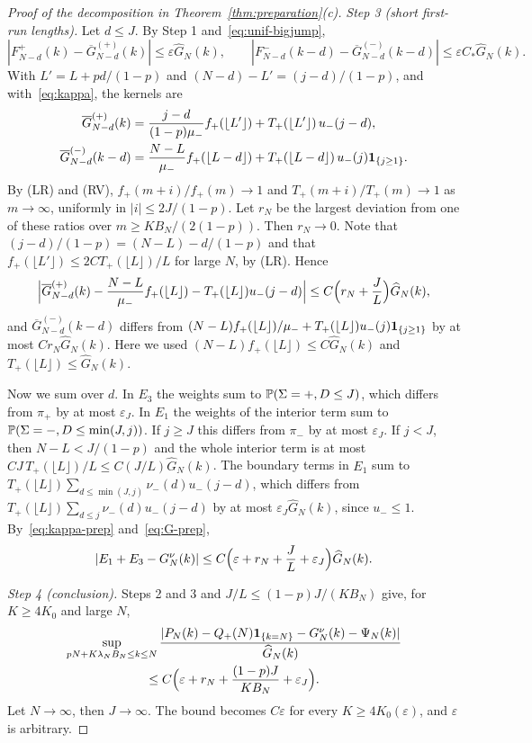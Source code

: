 \begin{proof}[Proof of the decomposition in Theorem~\ref{thm:preparation}(c)]
\emph{Step 3 (short first-run lengths).} Let $d\le J$. By Step 1
and~\eqref{eq:unif-bigjump},
\[
 |F^\plus_{N-d}(k)-\overline G^{(\plus)}_{N-d}(k)|\le\varepsilon\widehat G_N(k),\qquad
 |F^\minus_{N-d}(k-d)-\overline G^{(\minus)}_{N-d}(k-d)|\le\varepsilon C_*\widehat G_N(k).
\]
With $L'=L+pd/(1-p)$ and $(N-d)-L'=(j-d)/(1-p)$, and with~\eqref{eq:kappa}, the
kernels are
\begin{align*}
 \overline G^{({+})}_{N-d}(k)&=\frac{j-d}{(1-p)\mu_{-}}f_{+}(\lfloor L'\rfloor)+T_{+}(\lfloor L'\rfloor)\,u_{-}(j-d),\\
 \overline G^{({-})}_{N-d}(k-d)&=\frac{N-L}{\mu_{-}}f_{+}(\lfloor L-d\rfloor)+T_{+}(\lfloor L-d\rfloor)\,u_{-}(j)\mathbf{1}_{\{j\ge1\}} .
\end{align*}
By (LR) and (RV), $f_\plus(m+i)/f_\plus(m)\to1$ and $T_\plus(m+i)/T_\plus(m)\to1$ as
$m\to\infty$, uniformly in $|i|\le2J/(1-p)$. Let $r_N$ be the largest deviation
from one of these ratios over $m\ge KB_N/(2(1-p))$. Then $r_N\to0$. Note that
$(j-d)/(1-p)=(N-L)-d/(1-p)$ and that $f_\plus(\lfloor L'\rfloor)\le2CT_\plus(\lfloor L\rfloor)/L$
for large $N$, by (LR). Hence
\[
 \Bigl|\overline G^{({+})}_{N-d}(k)-\frac{N-L}{\mu_{-}}f_{+}(\lfloor L\rfloor)-T_{+}(\lfloor L\rfloor)u_{-}(j-d)\Bigr|
 \le C\Bigl(r_N+\frac JL\Bigr)\widehat G_N(k),
\]
and $\overline G^{(\minus)}_{N-d}(k-d)$ differs from
$(N-L)f_{+}(\lfloor L\rfloor)/\mu_{-}+T_{+}(\lfloor L\rfloor)u_{-}(j)\mathbf{1}_{\{j\ge1\}}$ by at
most $Cr_N\widehat G_N(k)$. Here we used $(N-L)f_\plus(\lfloor L\rfloor)\le C\widehat G_N(k)$
and $T_\plus(\lfloor L\rfloor)\le\widehat G_N(k)$.

Now we sum over $d$. In $E_3$ the weights sum to $\mathbb{P}(\Sigma={+},D\le J)$, which
differs from $\pi_\plus$ by at most $\varepsilon_J$. In $E_1$ the weights of the interior
term sum to $\mathbb{P}(\Sigma={-},D\le\min(J,j))$. If $j\ge J$ this differs from
$\pi_\minus$ by at most $\varepsilon_J$. If $j<J$, then $N-L<J/(1-p)$ and the whole
interior term is at most $CJ\,T_\plus(\lfloor L\rfloor)/L\le C(J/L)\widehat G_N(k)$. The
boundary terms in $E_1$ sum to $T_\plus(\lfloor L\rfloor)\sum_{d\le\min(J,j)}\nu_\minus(d)u_\minus(j-d)$,
which differs from $T_\plus(\lfloor L\rfloor)\sum_{d\le j}\nu_\minus(d)u_\minus(j-d)$ by at
most $\varepsilon_J\widehat G_N(k)$, since $u_\minus\le1$. By~\eqref{eq:kappa-prep}
and~\eqref{eq:G-prep},
\[
 |E_1+E_3-G^\nu_N(k)|\le C\Bigl(\varepsilon+r_N+\frac JL+\varepsilon_J\Bigr)\widehat G_N(k).
\]

\emph{Step 4 (conclusion).} Steps 2 and 3 and $J/L\le(1-p)J/(KB_N)$ give, for
$K\ge4K_0$ and large $N$,
\begin{multline*}
 \sup_{pN+K\lambda_NB_N\le k\le N}\frac{|P_N(k)-Q_{+}(N)\mathbf{1}_{\{k=N\}}-G^\nu_N(k)-\Psi_N(k)|}{\widehat G_N(k)}\\
 \le C\Bigl(\varepsilon+r_N+\frac{(1-p)J}{KB_N}+\varepsilon_J\Bigr).
\end{multline*}
Let $N\to\infty$, then $J\to\infty$. The bound becomes $C\varepsilon$ for every
$K\ge4K_0(\varepsilon)$, and $\varepsilon$ is arbitrary.
\end{proof}

